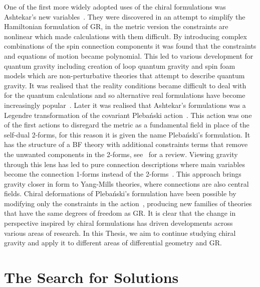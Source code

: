 \documentclass[10pt]{report}
\newcommand{\pleb}[0]{Pleba\'nski}
\theoremstyle{definition}
\begin{document}
One of the first more widely adopted uses of the chiral formulations was Ashtekar's new variables~\cite{NewVariablesFAshtek1986}. They were discovered in an attempt to simplify the Hamiltonian formulation of GR, in the metric version the constraints are nonlinear which made calculations with them difficult. By introducing complex combinations of the spin connection components it was found that the constraints and equations of motion became polynomial. This led to various development for quantum gravity including creation of loop quantum gravity and spin foam models which are non-perturbative theories that attempt to describe quantum gravity. It was realised that the reality conditions became difficult to deal with for the quantum calculations and so alternative real formulations have become increasingly popular~\cite{i_SO_i_Alexan_2000}. Later it was realised that Ashtekar's formulations was a Legendre transformation of the covariant \pleb{} action~\cite{OnTheSeparatiPleban1977}. This action was one of the first actions to disregard the metric as a fundamental field in place of the self-dual 2-forms, for this reason it is given the name \pleb{}'s formulation. It has the structure of a BF theory with additional constraints terms that remove the unwanted components in the 2-forms, see~\cite{BF_gravity_Celada_2016} for a review. Viewing gravity through this lens has led to pure connection descriptions where main variables become the connection 1-forms instead of the 2-forms~\cite{A_pure_spin_con_Capovi_1991,Pure_Connection_Krasno_2011}. This approach brings gravity closer in form to Yang-Mills theories, where connections are also central fields. Chiral deformations of \pleb{}'s formulation have been possible by modifying only the constraints in the action~\cite{Renormalizable_Krasno_2006}, producing new families of theories that have the same degrees of freedom as GR. It is clear that the change in perspective inspired by chiral formulations has driven developments across various areas of research. In this Thesis, we aim to continue studying chiral gravity and apply it to different areas of differential geometry and GR.

\section*{The Search for Solutions}
\end{document}
